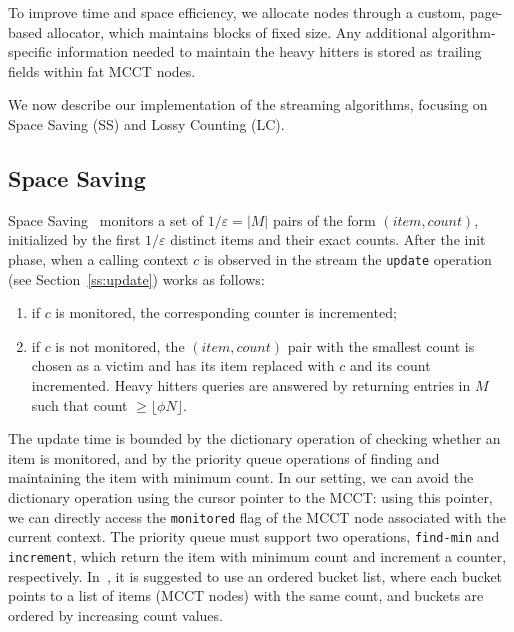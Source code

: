 \documentclass{sigplanconf}
\begin{document}
To improve time and space efficiency, we allocate nodes through a custom, page-based allocator, which maintains blocks of fixed size. 
Any additional algorithm-specific information needed to maintain the heavy hitters is stored as trailing fields within fat MCCT nodes.

We now describe our implementation of the streaming algorithms, focusing on Space Saving (SS) and Lossy Counting (LC).
 
\subsection{Space Saving}
\label{ss:ss}

Space Saving~\cite{MAA06} monitors a set of $1/\varepsilon=|M|$ pairs of the form $(item, count)$, initialized by the first $1/\varepsilon$ distinct items and their exact counts. After the init phase, when a calling context $c$ is observed in the stream the {\tt update} operation (see Section~\ref{ss:update}) works as follows: 

\begin{enumerate} 

\item if $c$ is monitored, the corresponding counter is incremented; 

\item if $c$ is not monitored, the $(item, count)$ pair with the smallest count is chosen as a victim and has its item replaced with $c$ and its count incremented. Heavy hitters queries are answered by returning entries in $M$ such that count $\geq \lfloor\phi N\rfloor$.

\end{enumerate}

\noindent The update time is bounded by the dictionary operation of checking whether an item is monitored, and by the priority queue operations of finding and maintaining the item with minimum count. In our setting, we can avoid the dictionary operation using the cursor pointer to the MCCT: using this pointer, we can directly access the {\tt monitored} flag of the MCCT node associated with the current context. The priority queue must support two operations, {\tt find-min} and {\tt increment}, which return the item with minimum count and increment a counter, respectively. In~\cite{MAA06}, it is suggested to use an ordered bucket list, where each bucket points to a list of items (MCCT nodes) with the same count, and buckets are ordered by increasing count values. 
\end{document}
